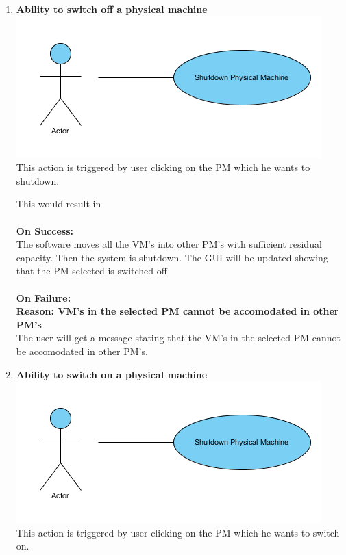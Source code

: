 \documentclass[a4paper,11pt]{article}
\begin{document}
\begin{enumerate}
				
				
				\item {\bf Ability to switch off a physical machine}\\
				\includegraphics{images/shut}
				\\This action is triggered by user clicking on the PM which he wants to shutdown. 
								
				This would result in \\\\
				{\bf On Success: }\\
				The software moves all the VM's into other PM's with sufficient residual capacity. Then the system is shutdown. 
				The GUI will be updated showing that the PM selected is switched off
				\\\\
				{\bf On Failure: } \\
				{\bf Reason: VM's in the selected PM cannot be accomodated in other PM's}\\
				The user will get a message stating that the VM's in the selected PM cannot be accomodated in other PM's.
				
				\item {\bf Ability to switch on a physical machine}\\
				\includegraphics{images/shut}
				\\This action is triggered by user clicking on the PM which he wants to switch on. 
				

\end{enumerate}
\end{document}
